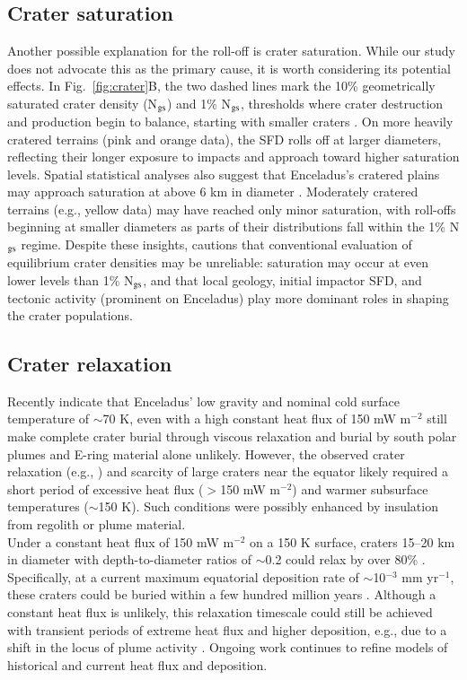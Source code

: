 \documentclass[preprint,11pt,3p,times,authoryear]{elsarticle}
\begin{document}
\subsection{Crater saturation}
\label{subsec:saturation}
Another possible explanation for the roll-off is crater saturation. While our study does not advocate this as the primary cause, it is worth considering its potential effects. In Fig.~\ref{fig:crater}B, the two dashed lines mark the 10\% geometrically saturated crater density (N$_{\rm gs}$) and 1\% N$_{\rm gs}$, thresholds where crater destruction and production begin to balance, starting with smaller craters \citep{Gault1970}. On more heavily cratered terrains (pink and orange data), the SFD rolls off at larger diameters, reflecting their longer exposure to impacts and approach toward higher saturation levels. Spatial statistical analyses also suggest that Enceladus’s cratered plains may approach saturation at above 6 km in diameter \citep{Kirchoff2018b}. Moderately cratered terrains (e.g., yellow data) may have reached only minor saturation, with roll-offs beginning at smaller diameters as parts of their distributions fall within the 1\% N$_{\rm gs}$ regime. Despite these insights, \citet{Xiao2015} cautions that conventional evaluation of equilibrium crater densities may be unreliable: saturation may occur at even lower levels than 1\% N$_{\rm gs}$, and that local geology, initial impactor SFD, and tectonic activity (prominent on Enceladus) play more dominant roles in shaping the crater populations.

\subsection{Crater relaxation}
\label{subsec:relax}
Recently \citet{Bland2012,Martin2023} indicate that Enceladus’ low gravity and nominal cold surface temperature of $\sim$70 K, even with a high constant heat flux of 150 mW m$^{-2}$ still make complete crater burial through viscous relaxation and burial by south polar plumes and E-ring material alone unlikely. However, the observed crater relaxation (e.g., \citealt{Bland2012}) and scarcity of large craters near the equator likely required a short period of excessive heat flux ($>$150 mW m$^{-2}$) and warmer subsurface temperatures ($\sim$150 K). Such conditions were possibly enhanced by insulation from regolith or plume material.\\

Under a constant heat flux of 150 mW m$^{-2}$ on a 150 K surface, craters 15–20 km in diameter with depth-to-diameter ratios of $\sim$0.2 could relax by over 80\% . Specifically, at a current maximum equatorial deposition rate of $\sim$10$^{-3}$ mm yr$^{-1}$, these craters could be buried within a few hundred million years \citep{Bland2012}. Although a constant heat flux is unlikely, this relaxation timescale could still be achieved with transient periods of extreme heat flux and higher deposition, e.g., due to a shift in the locus of plume activity \citep{Bland2012}. Ongoing work continues to refine models of historical and current heat flux and deposition.
\end{document}
